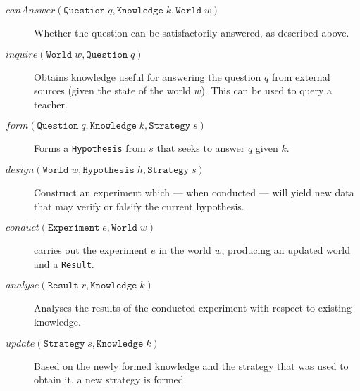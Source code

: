 \documentclass[\master/Master.tex]{subfiles}
\begin{document}
\begin{description}
    \item[$canAnswer( \texttt{Question} \; q
                    , \texttt{Knowledge} \; k
                    , \texttt{World} \; w
                    )
         $]
        Whether the question can be satisfactorily answered, as described above.

    \item[$inquire( \texttt{World} \; w
                  , \texttt{Question} \; q
                  )
         $]
        Obtains knowledge useful for answering the question $q$ from external sources (given the state of the world $w$). This can be used to query a teacher.

    \item[$form( \texttt{Question} \; q
               , \texttt{Knowledge} \; k
               , \texttt{Strategy} \; s
               )
         $]
        Forms a \texttt{Hypothesis} from $s$ that seeks to answer $q$ given $k$.

    \item[$design( \texttt{World} \; w
                 , \texttt{Hypothesis} \; h
                 , \texttt{Strategy} \; s
                 )
         $]
        Construct an experiment which --- when conducted --- will yield new data that may verify or falsify the current hypothesis.

    \item[$conduct( \texttt{Experiment} \; e
                  , \texttt{World} \; w
                  )
         $]
        carries out the experiment $e$ in the world $w$, producing an updated world and a \texttt{Result}.

    \item[$analyse( \texttt{Result} \; r
                  , \texttt{Knowledge} \; k
                  )
         $]
        Analyses the results of the conducted experiment with respect to existing knowledge.

    \item[$update( \texttt{Strategy} \; s
                 , \texttt{Knowledge} \; k
                 )
         $]
        Based on the newly formed knowledge and the strategy that was used to obtain it, a new strategy is formed.
\end{description}
\end{document}
